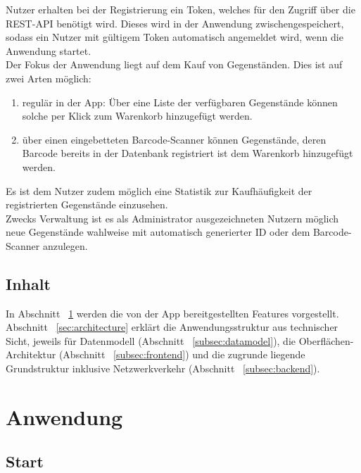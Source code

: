\documentclass{scrartcl}
\begin{document}
	Nutzer erhalten bei der Registrierung ein Token, welches für den Zugriff über die REST-API benötigt wird.
	Dieses wird in der Anwendung zwischengespeichert, sodass ein Nutzer mit gültigem Token automatisch angemeldet wird, wenn die Anwendung startet. \\
	Der Fokus der Anwendung liegt auf dem Kauf von Gegenständen.
	Dies ist auf zwei Arten möglich:

	\begin{enumerate}
		\item regulär in der App: Über eine Liste der verfügbaren Gegenstände können solche per Klick zum Warenkorb hinzugefügt werden.

		\item über einen eingebetteten Barcode-Scanner können Gegenstände, deren Barcode bereits in der Datenbank registriert ist dem Warenkorb hinzugefügt werden.
	\end{enumerate}

	Es ist dem Nutzer zudem möglich eine Statistik zur Kaufhäufigkeit der registrierten Gegenstände einzusehen. \\
	Zwecks Verwaltung ist es als Administrator ausgezeichneten Nutzern möglich neue Gegenstände wahlweise mit automatisch generierter ID oder dem Barcode-Scanner anzulegen.

	\subsection{Inhalt}\label{subsec:inhalt}

	In Abschnitt ~\ref{sec:features} werden die von der App bereitgestellten Features vorgestellt.
	Abschnitt ~\ref{sec:architecture} erklärt die Anwendungsstruktur aus technischer Sicht, jeweils für Datenmodell (Abschnitt ~\ref{subsec:datamodel}), die Oberflächen-Architektur (Abschnitt ~\ref{subsec:frontend}) und die zugrunde liegende Grundstruktur inklusive Netzwerkverkehr (Abschnitt ~\ref{subsec:backend}).


	\section{Anwendung}\label{sec:features}

	\subsection{Start}\label{subsec:start}
\end{document}
